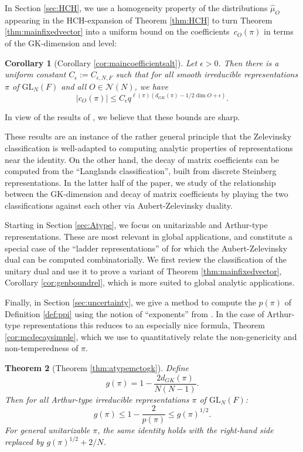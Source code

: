 \documentclass{amsart}
\newcommand{\f}{\frac}
\newcommand{\wh}{\widehat}
\newcommand{\mc}[1]{\mathcal{#1}}
\newcommand{\GL}{\mathrm{GL}}
\newcommand{\eps}{\epsilon}
\newcommand{\1}{\m 1}
\newtheorem{thm}{Theorem}[subsection]
\newtheorem{cor}[thm]{Corollary}
\theoremstyle{remark}
\theoremstyle{definition}
\numberwithin{equation}{subsection}
\begin{document}
In Section \ref{sec:HCH}, we use a homogeneity property of the distributions $\wh \mu_O$ appearing in the HCH-expansion of Theorem \ref{thm:HCH} to turn Theorem \ref{thm:mainfixedvector} into a uniform bound on the coefficients~$c_O(\pi)$ in terms of the GK-dimension and level: 

\begin{cor}[Corollary \ref{cor:maincoefficientsalt}]\label{cor:maincoefficientsaltintro}
Let $\eps > 0$. Then there is a uniform constant $C_\eps := C_{\eps, N, F}$ such that for all smooth irreducible representations $\pi$ of $\GL_N(F)$ and all $O \in \mc N(N)$, we have
\[
|c_O(\pi)| \leq C_\eps q^{\ell(\pi)(d_{GK}(\pi) - 1/2\dim O + \eps)}.
\]
\end{cor}
In view of the results of \cite[\S 6]{Mur03local}, we believe that these bounds are sharp.

These results are an instance of the rather general principle that the Zelevinsky classification is well-adapted to computing analytic properties of representations near the identity. On the other hand, the decay of matrix coefficients can be computed from the ``Langlands classification'', built from discrete Steinberg representations. In the latter half of the paper, we study of the relationship between the GK-dimension and decay of matrix coefficients by playing the two classifications against each other via Aubert-Zelevinsky duality. 

Starting in Section \ref{sec:Atype}, we focus on unitarizable and Arthur-type representations. These are most relevant in global applications, and constitute a special case of the ``ladder representations'' of \cite{LM14} for which the Aubert-Zelevinsky dual can be computed combinatorially.  We first review the classification of the unitary dual and use it to prove a variant of Theorem \ref{thm:mainfixedvector}, Corollary \ref{cor:genboundrel}, which is more suited to global analytic applications. 

Finally, in Section \ref{sec:uncertainty}, we give a method to compute the $p(\pi)$ of Definition \ref{def:ppi} using the notion of ``exponents'' from \cite{HC73, casselman1995introduction}. In the case of Arthur-type representations this reduces to an especially nice formula, Theorem \ref{cor:mcdecaysimple}, which we use to quantitatively relate the non-genericity and non-temperedness of $\pi$.

\begin{thm}[Theorem \ref{thm:atypemctogk}]\label{thm:mainuncertainty}
Define \[g(\pi)=1 - \frac{2d_{GK}(\pi)}{N(N-1)}.\] Then for all Arthur-type irreducible representations $\pi$ of $\GL_N(F)$:
\[
g(\pi) \leq 1 - \f2{p(\pi)} \leq g(\pi)^{1/2}. 
\]
For general unitarizable $\pi$, the same identity holds with the right-hand side replaced by $g(\pi)^{1/2} + 2/N$.
\end{thm}
\end{document}
